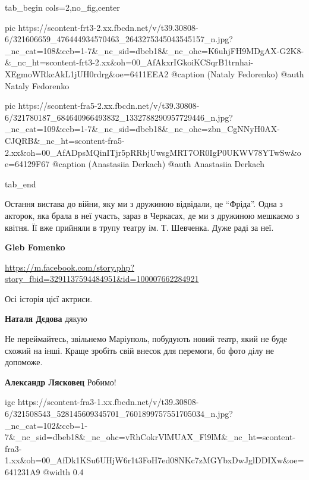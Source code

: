 \begin{center}
\begin{minipage}{\textwidth}

\ifcmt
  tab_begin cols=2,no_fig,center

     pic https://scontent-frt3-2.xx.fbcdn.net/v/t39.30808-6/321606659_476444934570463_2643275345043545157_n.jpg?_nc_cat=108&ccb=1-7&_nc_sid=dbeb18&_nc_ohc=K6uhjFH9MDgAX-G2K8-&_nc_ht=scontent-frt3-2.xx&oh=00_AfAkxrIGkoiKCSqrB1trnhai-XEgmoWRkcAkL1jUH0rdrg&oe=6411EEA2
     @caption (Nataly Fedorenko)
     @auth Nataly Fedorenko

     pic https://scontent-fra5-2.xx.fbcdn.net/v/t39.30808-6/321780187_684640966493832_1332788290957729446_n.jpg?_nc_cat=109&ccb=1-7&_nc_sid=dbeb18&_nc_ohc=zbn_CgNNyH0AX-CJQRB&_nc_ht=scontent-fra5-2.xx&oh=00_AfADpsMQinITjr5pRRbjUwsgMRT7OR0IgP0UKWV78YTwSw&oe=64129F67
     @caption (Anastasiia Derkach)
     @auth Anastasiia Derkach

  tab_end
\fi
\end{minipage}
\end{center}


Остання вистава до війни, яку ми з дружиною відвідали, це \enquote{Фріда}. Одна з
акторок, яка брала в неї участь, зараз в Черкасах, де ми з дружиною мешкаємо з
квітня. Її вже прийняли в трупу театру ім. Т. Шевченка. Дуже раді за неї.

\begin{itemize} %
\textbf{Gleb Fomenko}

\url{https://m.facebook.com/story.php?story_fbid=3291137594484951&id=100007662284921}

Осі історія цієї актриси.

\textbf{Наталя Дєдова} дякую
\end{itemize} %


Не переймайтесь, звільнемо Маріуполь, побудують новий театр, який не буде
схожий на інші. Краще зробіть свій внесок для перемоги, бо фото ділу не
допоможе.

\begin{itemize} %
\textbf{Александр Лясковец} Робимо! 💙💛
\end{itemize} %


\ifcmt
  igc https://scontent-fra3-1.xx.fbcdn.net/v/t39.30808-6/321508543_528145609345701_7601899757551705034_n.jpg?_nc_cat=102&ccb=1-7&_nc_sid=dbeb18&_nc_ohc=vRhCokrVlMUAX_Fl9lM&_nc_ht=scontent-fra3-1.xx&oh=00_AfDk1KSu6UHjW6r1t3FoH7ed08NKc7zMGYbxDwJglDDIXw&oe=641231A9
  @width 0.4
\fi

